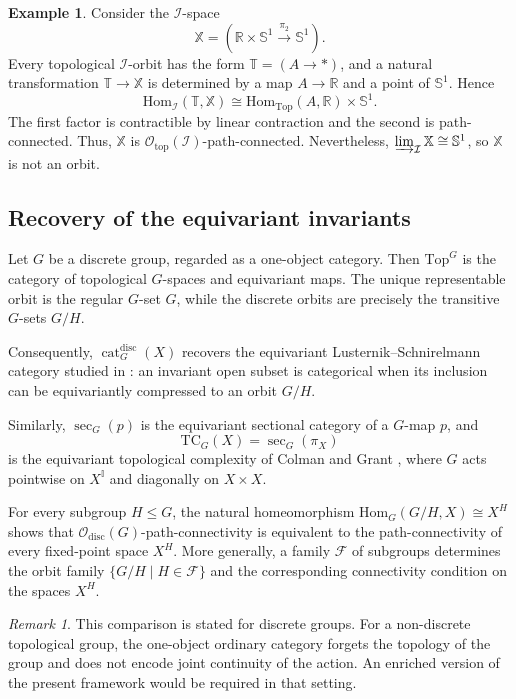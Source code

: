 \documentclass[12pt]{amsart}
\theoremstyle{definition}
\newtheorem{ex}[teo]{Example}
\theoremstyle{remark}
\newtheorem{rem}{Remark}
\numberwithin{figure}{section}%
\newcommand{\cat}{\mathop{\mathrm{cat}}}
\newcommand{\TC}{\mathrm{TC}}
\newcommand{\Top}{\mathrm{Top}}
\newcommand{\X}{\mathbb{X}}
\newcommand{\T}{\mathbb{T}}
\newcommand{\Hom}{\mathrm{Hom}}
\begin{document}
\begin{ex}\label{ex:connected-non-orbit}
Consider the $\mathcal I$-space
\[
\X=
\left(
\mathbb R\times\mathbb S^1
\xrightarrow{\pi_2}
\mathbb S^1
\right).
\]
Every topological $\mathcal I$-orbit has the form
$\T=(A\to *)$, and a natural transformation $\T\to\X$ is determined
by a map $A\to\mathbb R$ and a point of $\mathbb S^1$. Hence
\[
\Hom_{\mathcal I}(\T,\X)
\cong
\Hom_{\Top}(A,\mathbb R)\times\mathbb S^1.
\]
The first factor is contractible by linear contraction and the second is
path-connected. Thus, $\X$ is
$\mathcal O_{\mathrm{top}}(\mathcal I)$-path-connected. Nevertheless,
$\varinjlim_{\mathcal I}\X\cong\mathbb S^1$, so $\X$ is not an orbit.
\end{ex}

\subsection{Recovery of the equivariant invariants}
\label{subsec:equivariant-case}

Let $G$ be a discrete group, regarded as a one-object category. Then
$\Top^G$ is the category of topological $G$-spaces and equivariant maps.
The unique representable orbit is the regular $G$-set $G$, while the
discrete orbits are precisely the transitive $G$-sets $G/H$.

Consequently, $\cat_G^{\mathrm{disc}}(X)$ recovers the equivariant
Lusternik--Schnirelmann category studied in
\cite{Marzantowwicz,Colman,Grant-Colman-Equivariant}: an invariant open
subset is categorical when its inclusion can be equivariantly compressed
to an orbit $G/H$.

Similarly, $\sec_G(p)$ is the equivariant sectional category of a
$G$-map $p$, and
\[
\TC_G(X)=\sec_G(\pi_X)
\]
is the equivariant topological complexity of Colman and Grant
\cite{Grant-Colman-Equivariant}, where $G$ acts pointwise on
$X^{\mathbb I}$ and diagonally on $X\times X$.

For every subgroup $H\leq G$, the natural homeomorphism
$\Hom_G(G/H,X) \allowbreak\cong \allowbreak X^H$ shows that
$\mathcal O_{\mathrm{disc}}(G)$-path-connectivity is equivalent to the
path-connectivity of every fixed-point space $X^H$. More generally, a
family $\mathcal F$ of subgroups determines the orbit family
$\{G/H\mid H\in\mathcal F\}$ and the corresponding connectivity
condition on the spaces $X^H$.

\begin{rem}
This comparison is stated for discrete groups. For a non-discrete
topological group, the one-object ordinary category forgets the topology
of the group and does not encode joint continuity of the action. An
enriched version of the present framework would be required in that
setting.
\end{rem}
\end{document}
